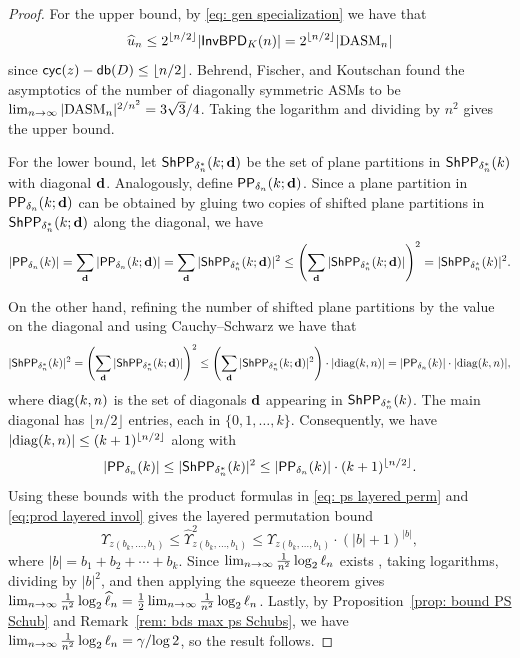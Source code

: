 \documentclass[10pt]{article}
\begin{document}
\begin{proof}
For the upper bound, by \eqref{eq: gen specialization} we have that 
\[
\widehat{u}_n \leq 2^{\lfloor n/2\rfloor} |\mathsf{InvBPD}_K(n)|= 2^{\lfloor n/2\rfloor}|\mathrm{DASM}_n|
\]
since $\textsf{cyc}(z) - \mathsf{db}(D) \leq \lfloor n/2\rfloor$. Behrend, Fischer, and Koutschan found the asymptotics of the  number of diagonally symmetric ASMs \cite[Thm. 11.2]{BFK} to be $\lim_{n\to \infty} |\mathrm{DASM}_n|^{2/n^2} = 3\sqrt{3}/4$. Taking the logarithm and dividing by $n^2$ gives the upper bound.




For the lower bound, let $\mathsf{ShPP}_{\delta^*_n}(k;{\bf d})$ be the set of plane partitions in $\mathsf{ShPP}_{\delta^*_n}(k)$ with diagonal ${\bf d}$. Analogously, define $\mathsf{PP}_{\delta_n}(k;{\bf d})$.
Since a plane partition in $\mathsf{PP}_{\delta_n}(k;{\bf d})$ can be obtained by gluing two copies of shifted plane partitions in  $\mathsf{ShPP}_{\delta^*_n}(k;{\bf d})$ along the diagonal, we have 
\[
|\mathsf{PP}_{\delta_n}(k)| = \sum_{\bf d}  |\mathsf{PP}_{\delta_n}(k;{\bf d})|=\sum_{\bf d} |\mathsf{ShPP}_{\delta^*_n}(k;{\bf d})|^2 \leq \left(\sum_{\bf d} |\mathsf{ShPP}_{\delta^*_n}(k;{\bf d})|\right)^2= |\mathsf{ShPP}_{\delta^*_n}(k)|^2.
\]
 
On the other hand, refining the number of shifted plane partitions by the value on the diagonal and using Cauchy--Schwarz we have that 
\[
|\mathsf{ShPP}_{\delta^*_n}(k)|^2 = \left(\sum_{\bf d} |\mathsf{ShPP}_{\delta^*_n}(k;{\bf d})|\right)^2 \leq \left(\sum_{\bf d} |\mathsf{ShPP}_{\delta^*_n}(k;{\bf d})|^2\right)\cdot |\mathrm{diag}(k,n)|=|\mathsf{PP}_{\delta_n}(k)| \cdot |\mathrm{diag}(k,n)|,
\]
where $\mathrm{diag}(k,n)$ is the set of diagonals ${\bf d}$ appearing in $\mathsf{ShPP}_{\delta^*_n}(k)$. 
The main diagonal has $\lfloor n/2\rfloor$ entries, each in $\{0,1,\dots,k\}$. Consequently, we have $| \mathrm{diag}(k,n)|\leq (k+1)^{\lfloor n/2\rfloor}$
along with
\[
|\mathsf{PP}_{\delta_n}(k)| \leq |\mathsf{ShPP}_{\delta^*_n}(k)|^2 \leq |\mathsf{PP}_{\delta_n}(k)|\cdot (k+1)^{\lfloor n/2 \rfloor}.
\]
Using these bounds with the product formulas in \eqref{eq: ps layered perm} and \eqref{eq:prod layered invol} gives the layered permutation bound
\[
{\Upsilon}_{z(b_k,\ldots,b_1)} \leq \widehat{\Upsilon}_{z(b_k,\ldots,b_1)}^2 \leq {\Upsilon}_{z(b_k,\ldots,b_1)} \cdot (|b|+1)^{|b|},
\]
where $|b|=b_1+b_2+\cdots + b_k$. 
Since $\lim_{n\to \infty} \tfrac{1}{n^2}\log_2 \ell_n$ exists \cite[Thm. 1.3]{MPP_schub},
taking logarithms, dividing by $|b|^2$, and then applying the squeeze theorem gives  $\lim_{n\to \infty} \tfrac{1}{n^2} \log_2 \widehat{\ell}_n = \tfrac12 \lim_{n\to \infty} \tfrac{1}{n^2}\log_2 \ell_n$. Lastly, by Proposition~\ref{prop: bound PS Schub} and Remark~\ref{rem: bds max ps Schubs}, we have $\lim_{n\to \infty} \tfrac{1}{n^2}\log_2 \ell_n =\gamma/{\log 2}$, so the result follows.
\end{proof}
\end{document}
